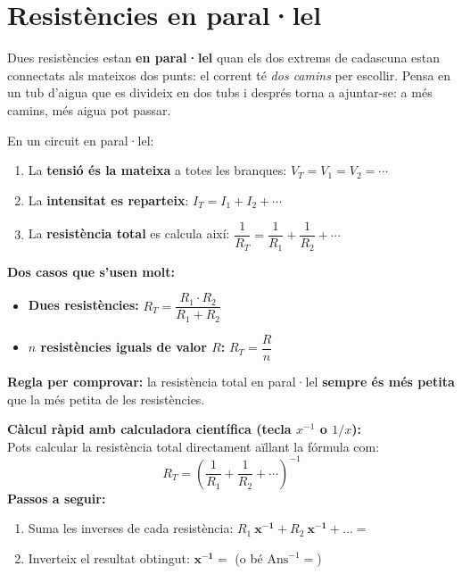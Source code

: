 \section{Resistències en paral·lel}

Dues resistències estan \textbf{en paral·lel} quan els dos extrems de cadascuna estan connectats als mateixos dos punts: el corrent té \emph{dos camins} per escollir. Pensa en un tub d'aigua que es divideix en dos tubs i després torna a ajuntar-se: a més camins, més aigua pot passar.

\begin{center}\end{center}

\begin{idea}
En un circuit en paral·lel:
\begin{enumerate}[label=\textbf{\arabic*.}]
 \item La \textbf{tensió és la mateixa} a totes les branques: \quad $V_T = V_1 = V_2 = \cdots$
 \item La \textbf{intensitat es reparteix}: \quad $I_T = I_1 + I_2 + \cdots$
 \item La \textbf{resistència total} es calcula així: \quad $\dfrac{1}{R_T} = \dfrac{1}{R_1} + \dfrac{1}{R_2} + \cdots$
\end{enumerate}
\end{idea}

\begin{idea}
\textbf{Dos casos que s'usen molt:}
\begin{itemize}
 \item \textbf{Dues resistències:} $R_T = \dfrac{R_1 \cdot R_2}{R_1 + R_2}$
 \item \textbf{$n$ resistències iguals de valor $R$:} $R_T = \dfrac{R}{n}$
\end{itemize}
\textbf{Regla per comprovar:} la resistència total en paral·lel \textbf{sempre és més petita} que la més petita de les resistències.
\end{idea}

\begin{idea}
\textbf{Càlcul ràpid amb calculadora científica (tecla $x^{-1}$ o $1/x$):}
\\[0.3em]
Pots calcular la resistència total directament aïllant la fórmula com:
\[
  R_T = \left( \frac{1}{R_1} + \frac{1}{R_2} + \cdots \right)^{-1}
\]
\textbf{Passos a seguir:}
\begin{enumerate}[label=\textbf{\arabic*.}]
 \item Suma les inverses de cada resistència: \quad $R_1\ \mathbf{x^{-1}} + R_2\ \mathbf{x^{-1}} + \dots =$
 \item Inverteix el resultat obtingut: \quad $\mathbf{x^{-1}} =$ \quad (o bé $\text{Ans}^{-1} =$)
\end{enumerate}
\end{idea}

